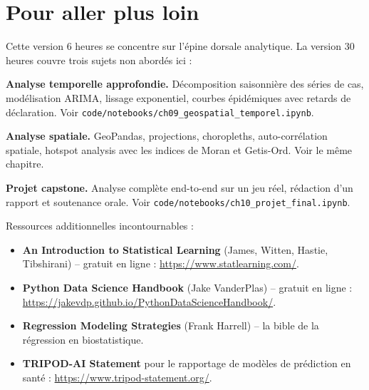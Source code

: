 \documentclass[11pt,a4paper]{article}
\begin{document}
\newpage


\section{Pour aller plus loin}

Cette version 6 heures se concentre sur l'\'epine dorsale analytique.
La version 30 heures couvre trois sujets non abord\'es ici :

\textbf{Analyse temporelle approfondie.} D\'ecomposition saisonni\`ere
des s\'eries de cas, mod\'elisation ARIMA, lissage exponentiel, courbes
\'epid\'emiques avec retards de d\'eclaration. Voir
\texttt{code/notebooks/ch09\_geospatial\_temporel.ipynb}.

\textbf{Analyse spatiale.} GeoPandas, projections, choropleths,
auto-corr\'elation spatiale, hotspot analysis avec les indices de Moran
et Getis-Ord. Voir le m\^eme chapitre.

\textbf{Projet capstone.} Analyse compl\`ete end-to-end sur un jeu r\'eel,
r\'edaction d'un rapport et soutenance orale. Voir
\texttt{code/notebooks/ch10\_projet\_final.ipynb}.

Ressources additionnelles incontournables :

\begin{itemize}
  \item \textbf{An Introduction to Statistical Learning} (James, Witten,
        Hastie, Tibshirani) -- gratuit en ligne :
        \url{https://www.statlearning.com/}.
  \item \textbf{Python Data Science Handbook} (Jake VanderPlas) --
        gratuit en ligne :
        \url{https://jakevdp.github.io/PythonDataScienceHandbook/}.
  \item \textbf{Regression Modeling Strategies} (Frank Harrell) -- la
        bible de la r\'egression en biostatistique.
  \item \textbf{TRIPOD-AI Statement} pour le rapportage de mod\`eles de
        pr\'ediction en sant\'e : \url{https://www.tripod-statement.org/}.
\end{itemize}

\newpage

\end{document}
